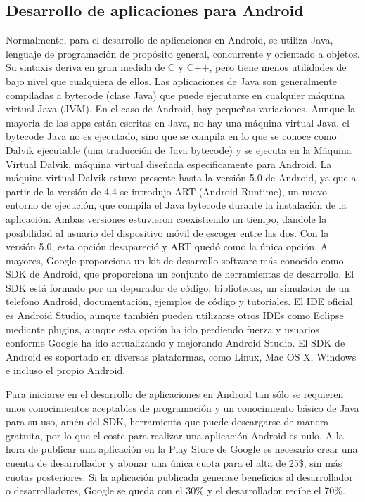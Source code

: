 \documentclass[
10pt, %
a4paper, %
oneside, %
headinclude,footinclude, %
BCOR5mm, %
]{scrartcl}
\begin{document}
\subsection{Desarrollo de aplicaciones para Android}
Normalmente, para el desarrollo de aplicaciones en Android, se utiliza Java, lenguaje de programación de propósito general, concurrente y orientado a objetos. Su sintaxis deriva en gran medida de C y C++, pero tiene menos utilidades de bajo nivel que cualquiera de ellos. Las aplicaciones de Java son generalmente compiladas a bytecode (clase Java) que puede ejecutarse en cualquier máquina virtual Java (JVM). En el caso de Android, hay pequeñas variaciones. Aunque la mayoria de las apps están escritas en Java, no hay una máquina virtual Java, el bytecode Java no es ejecutado, sino que se compila en lo que se conoce como Dalvik ejecutable (una traducción de Java bytecode) y se ejecuta en la Máquina Virtual Dalvik, máquina virtual diseñada especificamente para Android. La máquina virtual Dalvik estuvo presente hasta la versión 5.0 de Android, ya que a partir de la versión de 4.4 se introdujo ART (Android Runtime), un nuevo entorno de ejecución, que compila el Java bytecode durante la instalación de la aplicación. Ambas versiones estuvieron coexistiendo un tiempo, dandole la posibilidad al usuario del dispositivo móvil de escoger entre las dos. Con la versión 5.0, esta opción desapareció y ART quedó como la única opción. A mayores, Google proporciona un kit de desarrollo software más conocido como SDK de Android, que proporciona un conjunto de herramientas de desarrollo. El SDK está formado por un depurador de código, bibliotecas, un simulador de un telefono Android, documentación, ejemplos de código y tutoriales. El IDE oficial es Android Studio, aunque también pueden utilizarse otros IDEs como Eclipse mediante plugins, aunque esta opción ha ido perdiendo fuerza y usuarios conforme Google ha ido actualizando y mejorando Android Studio. El SDK de Android es soportado en diversas plataformas, como Linux, Mac OS X, Windows e incluso el propio Android.

Para iniciarse en el desarrollo de aplicaciones en Android tan sólo se requieren unos conocimientos aceptables de programación y un conocimiento básico de Java para su uso, amén del SDK, herramienta que puede descargarse de manera gratuita, por lo que el coste para realizar una aplicación Android es nulo. A la hora de publicar una aplicación en la Play Store de Google es necesario crear una cuenta de desarrollador y abonar una única cuota para el alta de 25\$, sin más cuotas posteriores. Si la aplicación publicada generase beneficios al desarrollador o desarrolladores, Google se queda con el 30\% y el desarrollador recibe el 70\%.
\end{document}
